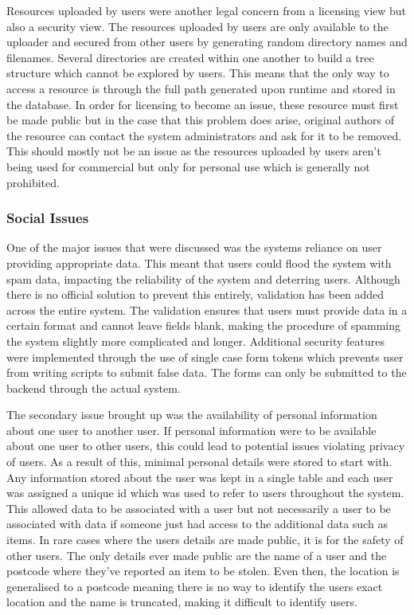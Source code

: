 Resources uploaded by users were another legal concern from a licensing view but also a security view. The resources uploaded by users are only available to the uploader and secured from other users by generating random directory names and filenames. Several directories are created within one another to build a tree structure which cannot be explored by users. This means that the only way to access a resource is through the full path generated upon runtime and stored in the database. In order for licensing to become an issue, these resource must first be made public but in the case that this problem does arise, original authors of the resource can contact the system administrators and ask for it to be removed. This should mostly not be an issue as the resources uploaded by users aren't being used for commercial but only for personal use which is generally not prohibited.

\subsubsection{Social Issues}
One of the major issues that were discussed was the systems reliance on user providing appropriate data. This meant that users could flood the system with spam data, impacting the reliability of the system and deterring users. Although there is no official solution to prevent this entirely, validation has been added across the entire system. The validation ensures that users must provide data in a certain format and cannot leave fields blank, making the procedure of spamming the system slightly more complicated and longer. Additional security features were implemented through the use of single case form tokens which prevents user from writing scripts to submit false data. The forms can only be submitted to the backend through the actual system.

The secondary issue brought up was the availability of personal information about one user to another user. If personal information were to be available about one user to other users, this could lead to potential issues violating privacy of users. As a result of this, minimal personal details were stored to start with. Any information stored about the user was kept in a single table and each user was assigned a unique id which was used to refer to users throughout the system. This allowed data to be associated with a user but not necessarily a user to be associated with data if someone just had access to the additional data such as items. In rare cases where the users details are made public, it is for the safety of other users. The only details ever made public are the name of a user and the postcode where they've reported an item to be stolen. Even then, the location is generalised to a postcode meaning there is no way to identify the users exact location and the name is truncated, making it difficult to identify users.

